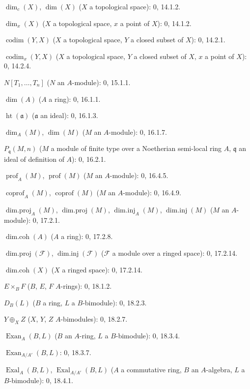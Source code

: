 $\dim_c(X)$, $\dim(X)$ ($X$ a topological space): 0, 14.1.2.\par
$\dim_x(X)$ ($X$ a topological space, $x$ a point of $X$): 0, 14.1.2.\par
$\operatorname{codim}(Y,X)$ ($X$ a topological space, $Y$ a closed subset of $X$): 0, 14.2.1.\par
$\operatorname{codim}_x(Y,X)$ ($X$ a topological space, $Y$ a closed subset of $X$, $x$ a point of $X$): 0, 14.2.4.\par
$N[T_1,\ldots,T_n]$ ($N$ an $A$-module): 0, 15.1.1.\par
$\dim(A)$ ($A$ a ring): 0, 16.1.1.\par
$\operatorname{ht}(\mathfrak a)$ ($\mathfrak a$ an ideal): 0, 16.1.3.\par
$\dim_A(M)$, $\dim(M)$ ($M$ an $A$-module): 0, 16.1.7.\par
$P_{\mathfrak q}(M,n)$ ($M$ a module of finite type over a Noetherian semi-local ring $A$, $\mathfrak q$ an ideal of definition of $A$): 0, 16.2.1.\par
$\operatorname{prof}_A(M)$, $\operatorname{prof}(M)$ ($M$ an $A$-module): 0, 16.4.5.\par
$\operatorname{coprof}_A(M)$, $\operatorname{coprof}(M)$ ($M$ an $A$-module): 0, 16.4.9.\par
$\operatorname{dim.proj}_A(M)$, $\operatorname{dim.proj}(M)$,
$\operatorname{dim.inj}_A(M)$, $\operatorname{dim.inj}(M)$ ($M$ an $A$-module): 0, 17.2.1.\par
$\operatorname{dim.coh}(A)$ ($A$ a ring): 0, 17.2.8.\par
$\operatorname{dim.proj}(\mathscr F)$, $\operatorname{dim.inj}(\mathscr F)$
($\mathscr F$ a module over a ringed space): 0, 17.2.14.\par
$\operatorname{dim.coh}(X)$ ($X$ a ringed space): 0, 17.2.14.\par
$E\times_B F$ ($B$, $E$, $F$ $A$-rings): 0, 18.1.2.\par
$D_B(L)$ ($B$ a ring, $L$ a $B$-bimodule): 0, 18.2.3.\par
$Y\oplus_X Z$ ($X$, $Y$, $Z$ $A$-bimodules): 0, 18.2.7.\par
$\operatorname{Exan}_A(B,L)$ ($B$ an $A$-ring, $L$ a $B$-bimodule): 0, 18.3.4.\par
$\operatorname{Exan}_{A/A'}(B,L)$: 0, 18.3.7.\par
$\operatorname{Exal}_A(B,L)$, $\operatorname{Exal}_{A/A'}(B,L)$ ($A$ a commutative ring, $B$ an $A$-algebra, $L$ a $B$-bimodule): 0, 18.4.1.\par
